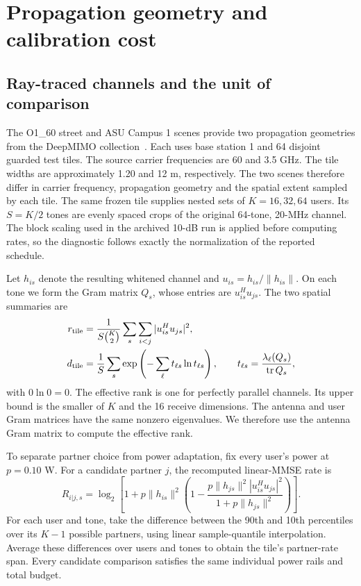 \documentclass[10pt,letterpaper]{article}
\begin{document}
\FloatBarrier
\section{Propagation geometry and calibration cost}
\label{supp:note5}

\subsection*{Ray-traced channels and the unit of comparison}
The O1\_60 street and ASU Campus 1 scenes provide two propagation geometries from the DeepMIMO collection~\cite{deepmimo}. Each uses base station 1 and 64 disjoint guarded test tiles. The source carrier frequencies are 60 and 3.5 GHz. The tile widths are approximately 1.20 and 12 m, respectively. The two scenes therefore differ in carrier frequency, propagation geometry and the spatial extent sampled by each tile. The same frozen tile supplies nested sets of \(K=16,32,64\) users. Its \(S=K/2\) tones are evenly spaced crops of the original 64-tone, 20-MHz channel. The block scaling used in the archived 10-dB run is applied before computing rates, so the diagnostic follows exactly the normalization of the reported schedule.

Let \(h_{is}\) denote the resulting whitened channel and \(u_{is}=h_{is}/\|h_{is}\|\). On each tone we form the Gram matrix \(Q_s\), whose entries are \(u_{is}^{H}u_{js}\). The two spatial summaries are
\begin{align}
r_{\rm tile}&=\frac{1}{S{K\choose2}}\sum_s\sum_{i<j}|u_{is}^{H}u_{js}|^2,\\
d_{\rm tile}&=\frac1S\sum_s\exp\left(-\sum_\ell t_{\ell s}\ln t_{\ell s}\right),
\qquad t_{\ell s}=\frac{\lambda_\ell(Q_s)}{\operatorname{tr}Q_s},
\end{align}
with \(0\ln0=0\). The effective rank is one for perfectly parallel channels. Its upper bound is the smaller of \(K\) and the 16 receive dimensions. The antenna and user Gram matrices have the same nonzero eigenvalues. We therefore use the antenna Gram matrix to compute the effective rank.

To separate partner choice from power adaptation, fix every user's power at \(p=0.10\) W. For a candidate partner \(j\), the recomputed linear-MMSE rate is
\begin{equation}
R_{i|j,s}=\log_2\left[1+p\|h_{is}\|^2
\left(1-\frac{p\|h_{js}\|^2|u_{is}^{H}u_{js}|^2}
{1+p\|h_{js}\|^2}\right)\right].
\end{equation}
For each user and tone, take the difference between the 90th and 10th percentiles over its \(K-1\) possible partners, using linear sample-quantile interpolation. Average these differences over users and tones to obtain the tile's partner-rate span. Every candidate comparison satisfies the same individual power rails and total budget.
\end{document}
